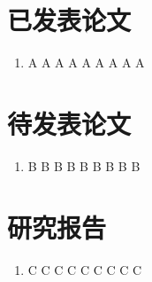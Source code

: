 ﻿\begin{publications}

\section*{已发表论文}

\begin{enumerate}
\renewcommand\labelenumi{[\arabic{enumi}]}
\item A A A A A A A A A
\end{enumerate}

\section*{待发表论文}

\begin{enumerate}
\renewcommand\labelenumi{[\arabic{enumi}]}
\setcounter{enumi}{1}
\item B B B B B B B B B
\end{enumerate}

\section*{研究报告}

\begin{enumerate}
\renewcommand\labelenumi{[\arabic{enumi}]}
\setcounter{enumi}{2}
\item C C C C C C C C C
\end{enumerate}

\end{publications}
